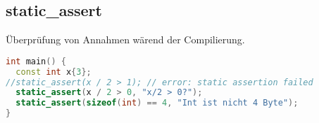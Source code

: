 \subsection{static\_assert}

Überprüfung von Annahmen wärend der Compilierung.

\begin{lstlisting}[language=C++]
int main() {
  const int x{3};
//static_assert(x / 2 > 1); // error: static assertion failed
  static_assert(x / 2 > 0, "x/2 > 0?");
  static_assert(sizeof(int) == 4, "Int ist nicht 4 Byte");
}
\end{lstlisting}
